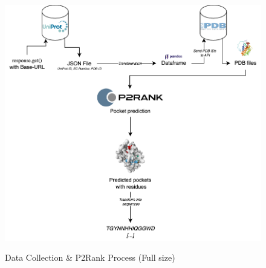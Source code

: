 \begin{figure}[hbt]
    \centering
    \begin{minipage}[t]{\textwidth}
    \caption{Data Collection \& P2Rank Process (Full size)}
    \includegraphics[width=1\textwidth]{img/Data-Preparation-Processing-Workflow.png}
    \label{fig:Data-Preparation-Processing-Workflow}
    \end{minipage}
\end{figure}